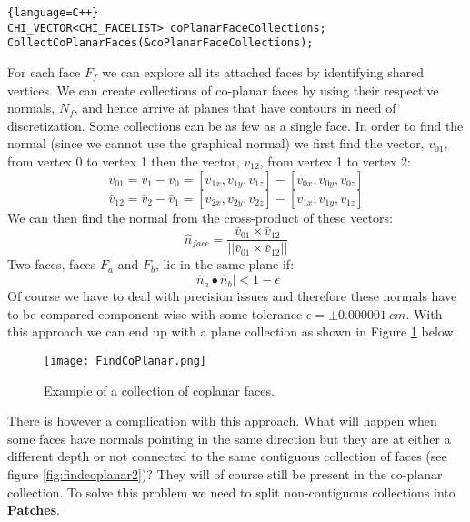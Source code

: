 \documentclass[11pt,letterpaper,titlepage]{article}
\begin{document}
\begin{lstlisting}{language=C++}
CHI_VECTOR<CHI_FACELIST> coPlanarFaceCollections;
CollectCoPlanarFaces(&coPlanarFaceCollections);
\end{lstlisting}
For each face $F_f$ we can explore all its attached faces by identifying shared vertices. We can create collections of co-planar faces by using their respective normals, $N_f$, and hence arrive at planes that have contours in need of discretization. Some collections can be as few as a single face. In order to find the normal (since we cannot use the graphical normal) we first find the vector, $v_{01}$, from vertex 0 to vertex 1 then the vector, $v_{12}$, from vertex 1 to vertex 2:
$$
\bar{v}_{01}=\bar{v}_{1}-\bar{v}_{0}=[v_{1x},v_{1y},v_{1z}] - [v_{0x},v_{0y},v_{0z}]
$$
$$
\bar{v}_{12}=\bar{v}_{2}-\bar{v}_{1}=[v_{2x},v_{2y},v_{2z}] - [v_{1x},v_{1y},v_{1z}]
$$
We can then find the normal from the cross-product of these vectors:
$$
\hat{n}_{face}=\frac{\bar{v}_{01} \times \bar{v}_{12}}
                    {||\bar{v}_{01} \times \bar{v}_{12}||}
$$
Two faces, faces $F_a$ and $F_b$, lie in the same plane if:
$$
\biggr | \hat{n}_a  \bullet \hat{n}_b \biggr | < 1-\epsilon
$$
Of course we have to deal with precision issues and therefore these normals have to be compared component wise with some tolerance $\epsilon=${$\pm 0.000001 \ cm$}. With this approach we can end up with a plane collection as shown in Figure \ref{figure:FindCoPlanar} below.

\begin{center}
	\begin{minipage}[c]{0.4\textwidth}

		\begin{figure}[H]
		
			\texttt{[image: FindCoPlanar.png]}
			\caption{Example of a collection of coplanar faces.}
			\label{figure:FindCoPlanar}
		\end{figure}
	\end{minipage}
\end{center}
\newpage
{}
\noindent
There is however a complication with this approach. What will happen when some faces have normals pointing in the same direction but they are at either a different depth or not connected to the same contiguous collection of faces (see figure \ref{fig:findcoplanar2})? They will of course still be present in the co-planar collection. To solve this problem we need to split non-contiguous collections into \textbf{Patches}.
\end{document}
